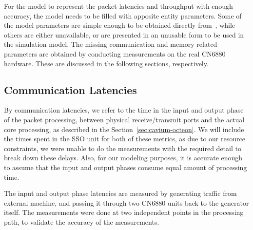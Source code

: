 For the model to represent the packet latencies and throughput with enough accuracy, the model needs to be filled with apposite entity parameters. Some of the model parameters are simple enough to be obtained directly from~\cite{cavium:2010:fundamentals}, while others are either unavailable, or are presented in an unusable form to be used in the simulation model. The missing communication and memory related parameters are obtained by conducting measurements on the real CN6880 hardware. These are discussed in the following sections, respectively.




\subsection{Communication Latencies}
\label{sec:communication-latencies}

By communication latencies, we refer to the time in the input and output phase of the packet processing, between physical receive/transmit ports and the actual core processing, as described in the Section~\ref{sec:cavium-octeon}. We will include the times spent in the SSO unit for both of these metrics, as due to our resource constraints, we were unable to do the measurements with the required detail to break down these delays. Also, for our modeling purposes, it is accurate enough to assume that the input and output phases consume equal amount of processing time.

The input and output phase latencies are measured by generating traffic from external machine, and passing it through two CN6880 units back to the generator itself. The measurements were done at two independent points in the processing path, to validate the accuracy of the measurements.

